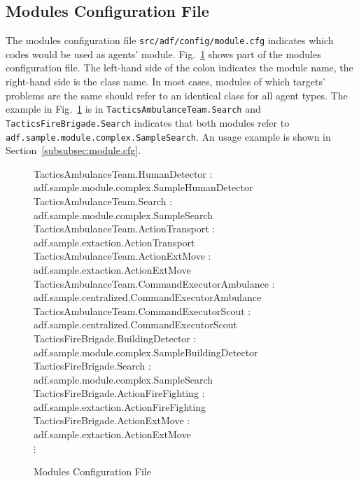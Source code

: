 \documentclass[a4paper]{article}
\begin{document}
\subsection{Modules Configuration File}
The modules configuration file \texttt{src/adf/config/module.cfg} indicates which codes would be used as agents' module. Fig.~\ref{fig:module.cfg} shows part of the modules configuration file. The left-hand side of the colon indicates the module name, the right-hand side is the class name. In most cases, modules of which targets' problems are the same should refer to an identical class for all agent types. The example in Fig.~\ref{fig:module.cfg} is in \texttt{TacticsAmbulanceTeam.Search} and \texttt{TacticsFireBrigade.Search} indicates that both modules refer to \\
\texttt{adf.sample.module.complex.SampleSearch}. An usage example is shown in Section~\ref{subsubsec:module.cfg}.


\begin{figure}[h]
 \begin{center}
  \begin{screen}
   {\ttfamily\small
TacticsAmbulanceTeam.HumanDetector : adf.sample.module.complex.SampleHumanDetector\\
TacticsAmbulanceTeam.Search : adf.sample.module.complex.SampleSearch\\

TacticsAmbulanceTeam.ActionTransport : adf.sample.extaction.ActionTransport\\
TacticsAmbulanceTeam.ActionExtMove : adf.sample.extaction.ActionExtMove\\

TacticsAmbulanceTeam.CommandExecutorAmbulance : adf.sample.centralized.CommandExecutorAmbulance\\
TacticsAmbulanceTeam.CommandExecutorScout : adf.sample.centralized.CommandExecutorScout\\

TacticsFireBrigade.BuildingDetector : adf.sample.module.complex.SampleBuildingDetector\\
TacticsFireBrigade.Search : adf.sample.module.complex.SampleSearch\\

TacticsFireBrigade.ActionFireFighting : adf.sample.extaction.ActionFireFighting\\
TacticsFireBrigade.ActionExtMove : adf.sample.extaction.ActionExtMove\\
$\vdots$
}
  \end{screen}
  \caption{Modules Configuration File}
  \label{fig:module.cfg}
 \end{center}
\end{figure}
\end{document}
